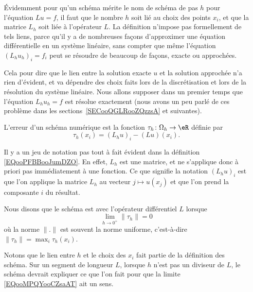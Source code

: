 \begin{normaltext}
	Évidemment pour qu'un schéma mérite le nom de schéma de pas \( h\) pour l'équation \( Lu=f\), il faut que le nombre \( h\) soit lié au choix des points \( x_i\), et que la matrice \( L_h\) soit liée à l'opérateur \( L\). La définition n'impose pas formellement de tels liens, parce qu'il y a de nombreuses façons d'approximer une équation différentielle en un système linéaire, sans compter que même l'équation \( (L_hu_h)_i=f_i\) peut se résoudre de beaucoup de façons, exacte ou approchées.

	Cela pour dire que le lien entre la solution exacte \( u\) et la solution approchée n'a rien d'évident, et va dépendre des choix faits lors de la discrétisation et lors de la résolution du système linéaire. Nous allons supposer dans un premier temps que l'équation \( L_hu_h=f\) est résolue exactement (nous avons un peu parlé de ces problème dans les sections~\ref{SECooQGLRooZQzzsA} et suivantes).
\end{normaltext}

\begin{definition}
	L'erreur  d'un schéma numérique est la fonction \( \tau_h\colon \Omega_h\to \eR\) définie par
	\begin{equation}        \label{EQooPFBBooJumDZO}
		\tau_h(x_i)=(L_hu)_i-(Lu)(x_i).
	\end{equation}
\end{definition}
Il y a un jeu de notation pas tout à fait évident dans la définition \eqref{EQooPFBBooJumDZO}. En effet, \( L_h\) est une matrice, et ne s'applique donc à priori pas immédiatement à une fonction. Ce que signifie la notation \( (L_hu)_i\) est que l'on applique la matrice \( L_h\) au vecteur \( j\mapsto u(x_j)\) et que l'on prend la composante \( i\) du résultat.

\begin{definition}
	Nous disons que le schéma est  avec l'opérateur différentiel \( L\) lorsque
	\begin{equation}        \label{EQooMPQYooCZsaAT}
		\lim_{h\to 0^+} \| \tau_h \|=0
	\end{equation}
	où la norme \( \| . \|\) est souvent la norme uniforme, c'est-à-dire \( \| \tau_h \|=\max_i\tau_h(x_i)\).
\end{definition}

Notons que le lien entre \( h\) et le choix des \( x_i\) fait partie de la définition des schéma. Sur un segment de longueur \( L\), lorsque \( h\) n'est pas un diviseur de \( L\), le schéma devrait expliquer ce que l'on fait pour que la limite \eqref{EQooMPQYooCZsaAT} ait un sens.


